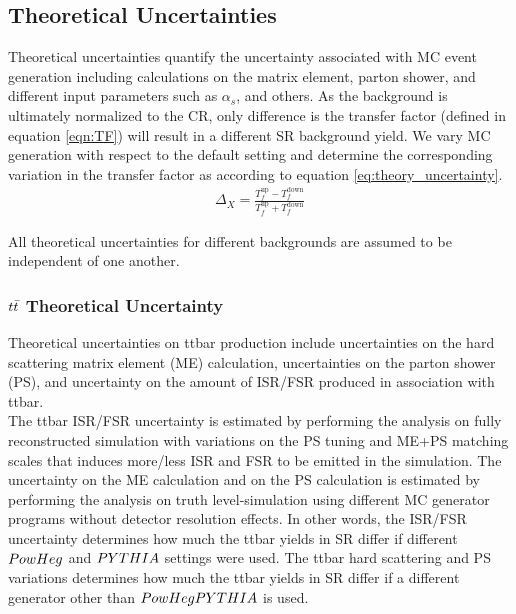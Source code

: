 
\subsection{Theoretical Uncertainties}
\label{sec:TheoSystematics}

\indent Theoretical uncertainties quantify the uncertainty associated with MC event generation including calculations on the matrix element, parton shower, and different input parameters such as $\alpha_s$, and others.  As the background is ultimately normalized to the CR, only difference is the transfer factor (defined in equation \ref{eqn:TF}) will result in a different SR background yield.  We vary MC generation with respect to the default setting and determine the corresponding variation in the transfer factor as according to equation \ref{eq:theory_uncertainty}. \\

 \begin{eqnarray}
    \Delta_{X} = \frac{T_f^{\mathrm{up}} - T_f^{\mathrm{down}}}{T_f^{\mathrm{up}} + T_f^{\mathrm{down}}}
    \label{eq:theory_uncertainty}
  \end{eqnarray}

\indent All theoretical uncertainties for different backgrounds are assumed to be independent of one another. \\

\subsubsection*{$t\bar{t}$ Theoretical Uncertainty}

\indent Theoretical uncertainties on ttbar production include uncertainties on the hard scattering matrix element (ME) calculation, uncertainties on the parton shower (PS), and uncertainty on the amount of ISR/FSR produced in association with ttbar.  \\

\indent The ttbar ISR/FSR uncertainty is estimated by performing the analysis on fully reconstructed simulation with variations on the PS tuning and ME+PS matching scales that induces more/less ISR and FSR to be emitted in the simulation. The uncertainty on the ME calculation and on the PS calculation is estimated by performing the analysis on truth level-simulation using different MC generator programs without detector resolution effects.  In other words, the ISR/FSR uncertainty determines how much the ttbar yields in SR differ if different $PowHeg$ and $PYTHIA$ settings were used.  The ttbar hard scattering and PS variations determines how much the ttbar yields in SR differ if a different generator other than $PowHegPYTHIA$ is used. \\

